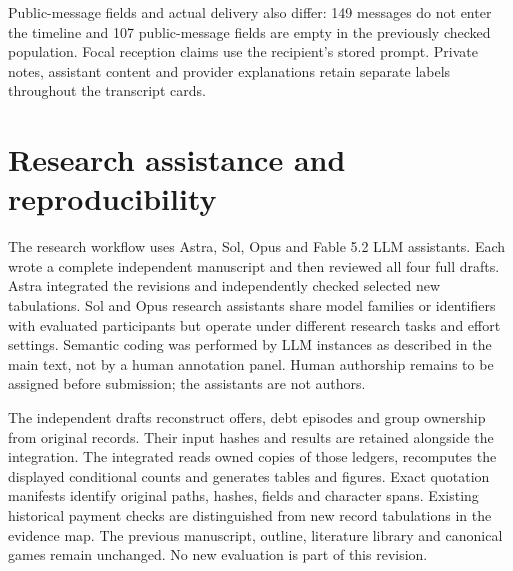 Public-message fields and actual delivery also differ: 149 messages do not enter the timeline and 107 public-message fields are empty in the previously checked population. Focal reception claims use the recipient's stored prompt. Private notes, assistant content and provider explanations retain separate labels throughout the transcript cards.

\section{Research assistance and reproducibility}
\label{app:provenance}

The research workflow uses Astra, Sol, Opus and Fable 5.2 LLM assistants. Each wrote a complete independent manuscript and then reviewed all four full drafts. Astra integrated the revisions and independently checked selected new tabulations. Sol and Opus research assistants share model families or identifiers with evaluated participants but operate under different research tasks and effort settings. Semantic coding was performed by LLM instances as described in the main text, not by a human annotation panel. Human authorship remains to be assigned before submission; the assistants are not authors.

The independent drafts reconstruct offers, debt episodes and group ownership from original records. Their input hashes and results are retained alongside the integration. The integrated  reads owned copies of those ledgers, recomputes the displayed conditional counts and generates tables and figures. Exact quotation manifests identify original paths, hashes, fields and character spans. Existing historical payment checks are distinguished from new record tabulations in the evidence map. The previous manuscript, outline, literature library and canonical games remain unchanged. No new evaluation is part of this revision.
